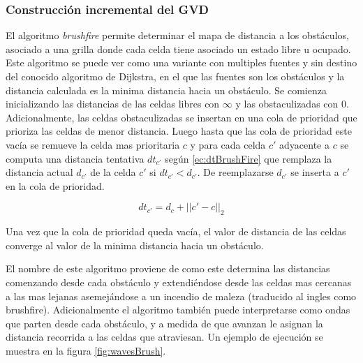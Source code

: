 \subsubsection{Construcción incremental del GVD}

El algoritmo \emph{brushfire} permite determinar el mapa de distancia a los obstáculos, asociado a una grilla donde cada celda tiene asociado un estado libre u ocupado. Este algoritmo se puede ver como una variante con multiples fuentes y sin destino del conocido algoritmo de Dijkstra, en el que las fuentes son los obstáculos y la distancia calculada es la minima distancia hacia un obstáculo. Se comienza inicializando las distancias de las celdas libres con $\infty$ y las obstaculizadas con $0$. Adicionalmente, las celdas obstaculizadas se insertan en una cola de prioridad que prioriza las celdas de menor distancia. Luego hasta que las cola de prioridad este vacía se remueve la celda mas prioritaria $c$ y para cada celda $c'$ adyacente a $c$ se computa una distancia tentativa $dt_{c'}$ según \eqref{ec:dtBrushFire} que remplaza la distancia actual $d_{c'}$ de la celda $c'$ si $dt_{c'}<d_{c'}$. De reemplazarse $d_{c'}$ se inserta a $c'$ en la cola de prioridad. 

\begin{equation}\label{ec:dtBrushFire}
  dt_{c'} = d_c+||c'-c||_2
\end{equation}

Una vez que la cola de prioridad queda vacía, el valor de distancia de las celdas converge al valor de la minima distancia hacia un obstáculo. 

El nombre de este algoritmo proviene de como este determina las distancias comenzando desde cada obstáculo y extendiéndose desde las celdas mas cercanas a las mas lejanas asemejándose a un incendio de maleza (traducido al ingles como brushfire). Adicionalmente el algoritmo también puede interpretarse como ondas que parten desde cada obstáculo, y a medida de que avanzan le asignan la distancia recorrida a las celdas que atraviesan. Un ejemplo de ejecución se muestra en la figura \ref{fig:wavesBrush}.  

